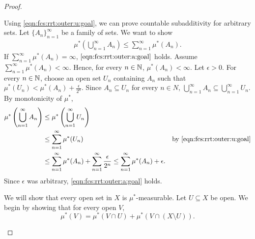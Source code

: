 \begin{proof}
\begin{step}
Using \ref{eqn:fcs:rrt:outer:u:goal}, we can prove countable subadditivity for arbitrary sets. 
Let $\{ A_n \}_{n = 1}^{\infty}$ be a family of sets. We want to show \begin{align}
    \label{eqn:fcs:rrt:outer:a:goal}
    \mu^{\ast} \left (\bigcup_{n=1}^{\infty} A_n 
    \right ) \leq \sum_{n = 1}^{\infty} \mu^{\ast}(A_n).
\end{align}
If $ \sum_{n = 1}^{\infty} \mu^{\ast}(A_n) = \infty$, $\ref{eqn:fcs:rrt:outer:a:goal}$ holds.
Assume $ \sum_{n = 1}^{\infty} \mu^{\ast}(A_n) < \infty$. Hence, for every $n \in {\mathbb N}$, $\mu^{\ast} (A_n) < \infty$. Let $\epsilon > 0$. For every $n \in {\mathbb N}$, choose an open set $U_n$ containing $A_n$ such that $\mu^{\ast}(U_n) < \mu^{\ast} (A_n) + \frac{\epsilon}{2^n}$. Since $A_n \subseteq U_n$ for every $n \in N$, $\bigcup_{n = 1}^{\infty} A_n \subseteq \bigcup_{n = 1}^{\infty} U_n$. By monotonicity of $\mu^{\ast}$, \begin{align*}
    \mu^{\ast} \left ( \bigcup_{n = 1}^{\infty} A_n  \right) &\leq \mu^{\ast} \left ( \bigcup_{n = 1}^{\infty} U_n \right) &  \\
        &\leq \sum_{n = 1}^{\infty} \mu^{\ast} (U_n)  & \text{by \ref{eqn:fcs:rrt:outer:u:goal}} \\
        &\leq \sum_{n = 1}^{\infty} \mu^{\ast} (A_n) + \sum_{n = 1}^{\infty} \frac{\epsilon}{2^n} \leq \sum_{n = 1}^{\infty} \mu^{\ast} (A_n) + \epsilon.
\end{align*}
Since $\epsilon$ was arbitrary, \ref{eqn:fcs:rrt:outer:a:goal} holds. 
\end{step}

\begin{step}

We will show that every open set in $X$ is $\mu^{\ast}$-measurable. Let $U \subseteq X$ be open. We begin by showing that for every open $V$,  \begin{equation}
    \label{eqn:fcs:rrt:borel:open_goal}
    \mu^{\ast}(V) = \mu^{\ast}(V \cap U) + \mu^{\ast}(V \cap (X \setminus U)).
\end{equation}


\end{step}
\end{proof}
